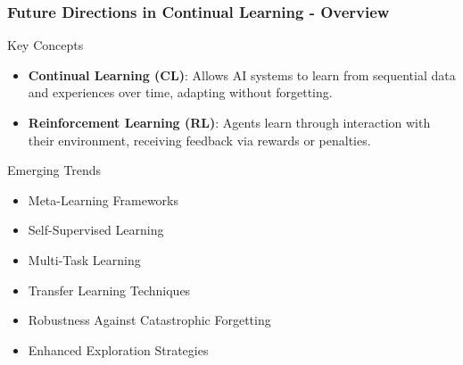 \documentclass[aspectratio=169]{beamer}
\begin{document}
\begin{frame}[fragile]
    \frametitle{Future Directions in Continual Learning - Overview}
    \begin{block}{Key Concepts}
        \begin{itemize}
            \item \textbf{Continual Learning (CL)}: Allows AI systems to learn from sequential data and experiences over time, adapting without forgetting.
            \item \textbf{Reinforcement Learning (RL)}: Agents learn through interaction with their environment, receiving feedback via rewards or penalties.
        \end{itemize}
    \end{block}

    \begin{block}{Emerging Trends}
        \begin{itemize}
            \item Meta-Learning Frameworks
            \item Self-Supervised Learning
            \item Multi-Task Learning
            \item Transfer Learning Techniques
            \item Robustness Against Catastrophic Forgetting
            \item Enhanced Exploration Strategies
        \end{itemize}
    \end{block}
\end{frame}
\end{document}

